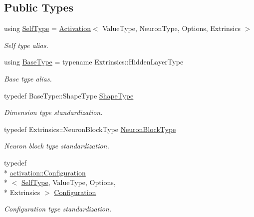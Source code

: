 \subsection*{Public Types}
\begin{DoxyCompactItemize}
\item 
using \hyperlink{classffnn_1_1layer_1_1_activation_aab2c75ad25e7d5cb41d6245c3d8e7469}{Self\-Type} = \hyperlink{classffnn_1_1layer_1_1_activation}{Activation}$<$ Value\-Type, Neuron\-Type, Options, Extrinsics $>$
\begin{DoxyCompactList}\small\item\em Self type alias. \end{DoxyCompactList}\item 
using \hyperlink{classffnn_1_1layer_1_1_activation_a691766ba2bf67fd7f0987f4811d66850}{Base\-Type} = typename Extrinsics\-::\-Hidden\-Layer\-Type
\begin{DoxyCompactList}\small\item\em Base type alias. \end{DoxyCompactList}\item 
typedef Base\-Type\-::\-Shape\-Type \hyperlink{classffnn_1_1layer_1_1_activation_a50e86585638a341d23f072d061889503}{Shape\-Type}
\begin{DoxyCompactList}\small\item\em Dimension type standardization. \end{DoxyCompactList}\item 
typedef Extrinsics\-::\-Neuron\-Block\-Type \hyperlink{classffnn_1_1layer_1_1_activation_a782e7afdc6d76a9a4cbac43c7c36e21e}{Neuron\-Block\-Type}
\begin{DoxyCompactList}\small\item\em Neuron block type standardization. \end{DoxyCompactList}\item 
typedef \\*
\hyperlink{classffnn_1_1layer_1_1activation_1_1_configuration}{activation\-::\-Configuration}\\*
$<$ \hyperlink{classffnn_1_1layer_1_1_activation_aab2c75ad25e7d5cb41d6245c3d8e7469}{Self\-Type}, Value\-Type, Options, \\*
Extrinsics $>$ \hyperlink{classffnn_1_1layer_1_1_activation_ac23a5193d2f33e6aef06c8571f956fbb}{Configuration}
\begin{DoxyCompactList}\small\item\em Configuration type standardization. \end{DoxyCompactList}\end{DoxyCompactItemize}
